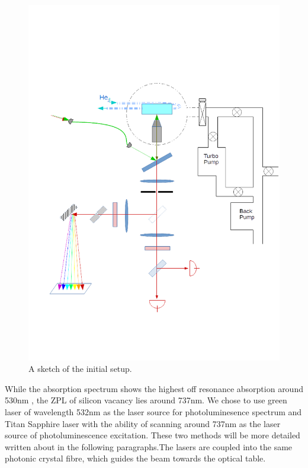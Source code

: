 \begin{figure}[h]
\centering
\includegraphics[width=1\linewidth]{Figures/pic/initialsetup}
\caption{A sketch of the initial setup.}
\label{fig:initialsetup}
\end{figure}

While the absorption spectrum shows the highest off resonance absorption around 530nm \citep{iakoubovskii_luminescence_2000,albrecht_coupling_2013,rogers_electronic_2014}, the ZPL of silicon vacancy lies around 737nm. We chose to use green laser of wavelength 532nm as the laser source for photoluminesence spectrum and Titan Sapphire laser with the ability of scanning around 737nm as the laser source of photoluminescence excitation. These two methods will be more detailed written about in the following paragraphs.The lasers are coupled into the same photonic crystal fibre, which guides the beam towards the optical table.


